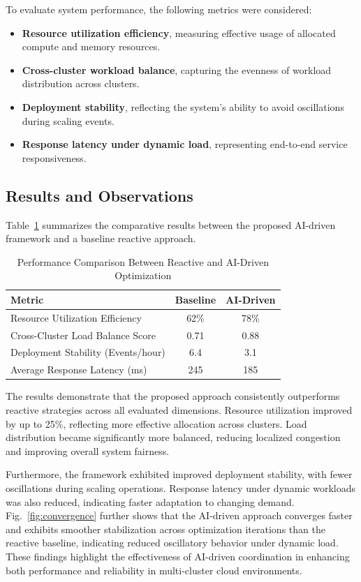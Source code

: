\documentclass[conference]{IEEEtran}
\begin{document}
To evaluate system performance, the following metrics were considered:

\begin{itemize}
    \item \textbf{Resource utilization efficiency}, measuring effective usage of allocated compute and memory resources.
    \item \textbf{Cross-cluster workload balance}, capturing the evenness of workload distribution across clusters.
    \item \textbf{Deployment stability}, reflecting the system’s ability to avoid oscillations during scaling events.
    \item \textbf{Response latency under dynamic load}, representing end-to-end service responsiveness.
\end{itemize}

\subsection{Results and Observations}

Table~\ref{tab:results} summarizes the comparative results between the proposed AI-driven framework and a baseline reactive approach.

\begin{table}[htbp]
\centering
\small
\caption{Performance Comparison Between Reactive and AI-Driven Optimization}
\label{tab:results}
\begin{tabular}{lcc}
\toprule
\textbf{Metric} & \textbf{Baseline} & \textbf{AI-Driven} \\
\midrule
Resource Utilization Efficiency & 62\% & 78\% \\
Cross-Cluster Load Balance Score & 0.71 & 0.88 \\
Deployment Stability (Events/hour) & 6.4 & 3.1 \\
Average Response Latency (ms) & 245 & 185 \\
\bottomrule
\end{tabular}
\end{table}

The results demonstrate that the proposed approach consistently outperforms reactive strategies across all evaluated dimensions. Resource utilization improved by up to 25\%, reflecting more effective allocation across clusters. Load distribution became significantly more balanced, reducing localized congestion and improving overall system fairness.

Furthermore, the framework exhibited improved deployment stability, with fewer oscillations during scaling operations. Response latency under dynamic workloads was also reduced, indicating faster adaptation to changing demand. Fig.~\ref{fig:convergence} further shows that the AI-driven approach converges faster and exhibits smoother stabilization across optimization iterations than the reactive baseline, indicating reduced oscillatory behavior under dynamic load. These findings highlight the effectiveness of AI-driven coordination in enhancing both performance and reliability in multi-cluster cloud environments.
\end{document}
